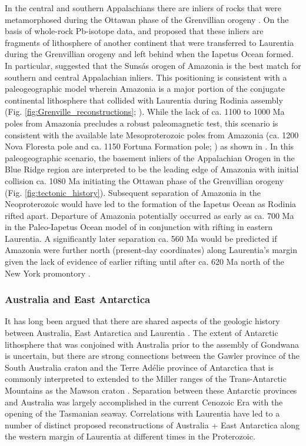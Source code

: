 \documentclass[twocolumn, switch]{article} %
\begin{document}
In the central and southern Appalachians there are inliers of rocks that were metamorphosed during the Ottawan phase of the Grenvillian orogeny \citep{McLelland2013a}. On the basis of whole-rock Pb-isotope data, \cite{Loewy2003a} and \cite{Fisher2010a} proposed that these inliers are fragments of lithosphere of another continent that were transferred to Laurentia during the Grenvillian orogeny and left behind when the Iapetus Ocean formed. In particular, \cite{Fisher2010a} suggested that the Suns\'as orogen of Amazonia is the best match for southern and central Appalachian inliers. This positioning is consistent with a paleogeographic model wherein Amazonia is a major portion of the conjugate continental lithosphere that collided with Laurentia during Rodinia assembly (Fig. \ref{fig:Grenville_reconstructions}; \citealp{Hoffman1991a, Evans2013b, Cawood2017a}). While the lack of ca. 1100 to 1000 Ma poles from Amazonia precludes a robust paleomagnetic test, this scenario is consistent with the available late Mesoproterozoic poles from Amazonia (ca. 1200 Nova Floresta pole and ca. 1150 Fortuna Formation pole; \citealp{DAgrella-Filho2021a}) as shown in \cite{Evans2013b}. In this paleogeographic scenario, the basement inliers of the Appalachian Orogen in the Blue Ridge region are interpreted to be the leading edge of Amazonia with initial collision ca. 1080 Ma initiating the Ottawan phase of the Grenvillian orogeny (Fig. \ref{fig:tectonic_history}). Subsequent separation of Amazonia in the Neoproterozoic would have led to the formation of the Iapetus Ocean as Rodinia rifted apart. Departure of Amazonia potentially occurred as early as ca. 700 Ma in the Paleo-Iapetus Ocean model of \citet{Robert2020a} in conjunction with rifting in eastern Laurentia. A significantly later separation ca. 560 Ma would be predicted if Amazonia were further north (present-day coordinates) along Laurentia's margin given the lack of evidence of earlier rifting until after ca. 620 Ma north of the New York promontory \citep{Allen2010a}.

\subsubsection{Australia and East Antarctica}

It has long been argued that there are shared aspects of the geologic history between Australia, East Antarctica and Laurentia \citep{Moores1991a}. The extent of Antarctic lithosphere that was conjoined with Australia prior to the assembly of Gondwana is uncertain, but there are strong connections between the Gawler province of the South Australia craton and the Terre Ad\'elie province of Antarctica that is commonly interpreted to extended to the Miller ranges of the Trans-Antarctic Mountains as the Mawson craton \citep{Payne2009b}.  Separation between these Antarctic provinces and Australia was largely accomplished in the current Cenozoic Era with the opening of the Tasmanian seaway. Correlations with Laurentia have led to a number of distinct proposed reconstructions of Australia + East Antarctica along the western margin of Laurentia at different times in the Proterozoic.
\end{document}
